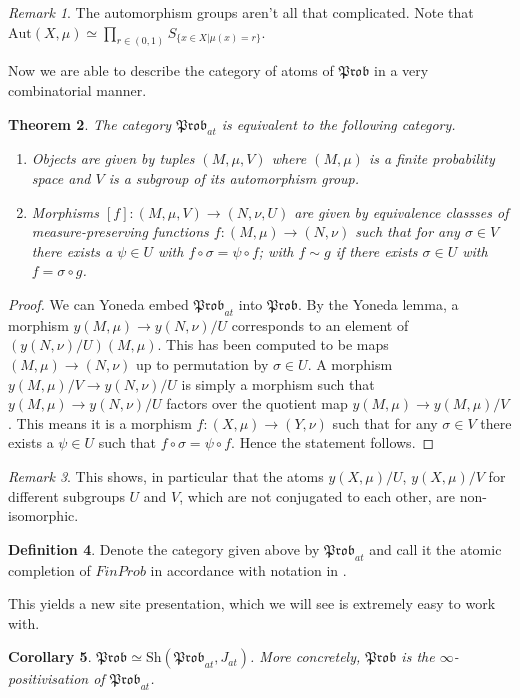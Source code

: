 \documentclass[a4paper]{amsproc}
\theoremstyle{plain}
\newtheorem{theorem}{Theorem}[section]
\newtheorem{corollary}[theorem]{Corollary}
\theoremstyle{definition}
\newtheorem{definition}[theorem]{Definition}
\theoremstyle{remark}
\newtheorem{remark}[theorem]{Remark}
\numberwithin{equation}{section}
\begin{document}
\begin{remark} The automorphism groups aren't all that complicated. Note that $\text{Aut}(X,\mu)\simeq \prod_{r\in (0,1)} S_{\{x\in X| \mu(x)=r \}}$.
\end{remark}

Now we are able to describe the category of atoms of $\mathfrak{Prob}$ in a very combinatorial manner. 

\begin{theorem} The category $\mathfrak{Prob}_{at}$ is equivalent to the following category. \begin{enumerate}
\item Objects are given by tuples $(M,\mu, V)$ where $(M,\mu)$ is a finite probability space and $V$ is a subgroup of its automorphism group. 
\item Morphisms $[f]:(M,\mu, V)\rightarrow (N,\nu, U)$ are given by equivalence classses of measure-preserving functions $f:(M,\mu)\rightarrow (N,\nu)$ such that for any $\sigma\in V$ there exists a $\psi\in U$ with $f\circ \sigma =\psi\circ f $; with $f\sim g$ if there exists $\sigma\in U$ with $f=\sigma\circ g$.
\end{enumerate}
\end{theorem}
\begin{proof}
We can Yoneda embed $\mathfrak{Prob}_{at}$ into $\mathfrak{Prob}$.  By the Yoneda lemma, a morphism $y(M,\mu)\rightarrow y(N,\nu)/U$ corresponds to an element of $(y(N,\nu)/U)(M,\mu)$. This has been computed to be maps $(M,\mu)\rightarrow (N,\nu)$ up to permutation by $\sigma\in U$. A morphism $y(M,\mu)/V \rightarrow y(N,\nu)/U$ is simply a morphism such that $y(M,\mu)\rightarrow y(N,\nu)/U$ factors over the quotient map $y(M,\mu)\rightarrow y(M,\mu)/V$. This means it is a morphism $f:(X,\mu)\rightarrow (Y,\nu)$ such that for any $\sigma\in V$ there exists a $\psi\in U$ such that $f\circ \sigma =\psi\circ f $. Hence the statement follows.
\end{proof}

\begin{remark} This shows, in particular that the atoms $y(X,\mu)/U$, $y(X,\mu)/V$ for different subgroups $U$ and $V$, which are not conjugated to each other, are non-isomorphic. %
\end{remark}

\begin{definition} Denote the category given above by $\mathfrak{Prob}_{at}$ and call it the atomic completion of $FinProb$ in accordance with notation in \cite{caramello_lafforgue}.
\end{definition}
This yields a new site presentation, which we will see is extremely easy to work with.
\begin{corollary} \label{coprod_representation}
    $\mathfrak{Prob}\simeq \text{Sh}(\mathfrak{Prob}_{at},J_{at})$. More concretely, $\mathfrak{Prob}$ is the $\infty$-positivisation of $\mathfrak{Prob}_{at}$. %
\end{corollary}
\end{document}
